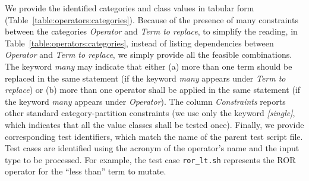 %
We provide the identified categories and class values in tabular form (Table~\ref{table:operators:categories}).
Because of the presence of many constraints between the categories \emph{Operator} and \emph{Term to replace},
to simplify the reading, in Table~\ref{table:operators:categories}, instead of listing dependencies between \emph{Operator} and \emph{Term to replace}, we simply provide all the feasible combinations.
The keyword \emph{many} may indicate that either (a) more than one term should be replaced in the same statement (if the keyword \emph{many} appears under \emph{Term to replace}) or (b) more than one operator shall be applied in the same statement (if the keyword \emph{many} appears under \emph{Operator}).
The column \emph{Constraints} reports other standard category-partition constraints (we use only the keyword \emph{[single]}, which indicates that all the value classes shall be tested once).
Finally, we provide corresponding test identifiers, which match the name of the parent test script file. Test cases are identified using the acronym of the operator's name and the input type to be processed. For example, the test case \texttt{ror\_lt.sh} represents the ROR operator for the ``less than'' term to mutate.


